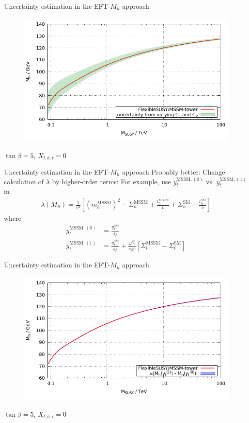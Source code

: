 \documentclass[hyperref={pdfpagelabels=false},ngerman]{beamer}
\newcommand{\SM}{\ensuremath{\text{SM}}}
\newcommand{\MSSM}{\ensuremath{\text{MSSM}}}
\begin{document}
\begin{frame}{Uncertainty estimation in the EFT-$M_h$ approach}
  \begin{figure}
    \centering
    \includegraphics[width=\textwidth]{plots/scale_MSSM_uncertainty_tower_C1C2}
  \end{figure}
  $\tan\beta = 5$, $X_{t,b,\tau} = 0$
\end{frame}

\begin{frame}{Uncertainty estimation in the EFT-$M_h$ approach}
  Probably better: Change calculation of $\lambda$ by higher-order
  terms: For example, use $y_t^{\text{MSSM},(0)}$
  vs. $y_t^{\text{MSSM},(1)}$ in
  \begin{align*}
    \lambda(M_S) = \frac{1}{v^2} \left[
      (m_h^\text{MSSM})^2 - \Sigma^{\MSSM}_h + \frac{t_h^\text{MSSM}}{v}
      + \Sigma^{\SM}_h - \frac{t_h^\SM}{v}
    \right]
  \end{align*}
  where
  \begin{align*}
    y_t^{\text{MSSM},(0)} &= \frac{y_t^{\SM}}{s_\beta} \\
    y_t^{\text{MSSM},(1)} &= \frac{y_t^{\SM}}{s_\beta} + \frac{\sqrt{2}}{s_\beta v}
    \left[ \Sigma_t^{\text{MSSM}} - \Sigma_t^{\SM} \right]
  \end{align*}
\end{frame}

\begin{frame}{Uncertainty estimation in the EFT-$M_h$ approach}
  \begin{figure}
    \centering
    \includegraphics[width=\textwidth]{plots/scale_MSSM_uncertainty_tower_yt}
  \end{figure}
  $\tan\beta = 5$, $X_{t,b,\tau} = 0$
\end{frame}
\end{document}
